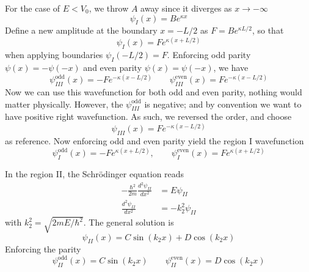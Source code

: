 \documentclass[../../../main.tex]{subfiles}
\begin{document}
For the case of $E<V_0$, we throw $A$ away since it diverges as $x \rightarrow -\infty$
\begin{equation*}
  \psi_{I}(x) = B e^{\kappa x}
\end{equation*}
Define a new amplitude at the boundary \(x = -L/2\) as $F = B e^{\kappa L/2}$, so that
\begin{equation*}
  \psi_{I}(x) = F e^{\kappa (x + L/2)}
\end{equation*}
when applying boundaries $\psi_{I}(-L/2) = F$.
Enforcing odd parity $\psi(x)=-\psi(-x)$ and even  parity $\psi(x)=\psi(-x)$, we have
\begin{equation*}
  \psi_{III}^{\text{odd}}(x) = -F e^{-\kappa (x - L/2)}
  \qquad
  \psi_{III}^{\text{even}}(x) = F e^{-\kappa (x - L/2)}
\end{equation*}
Now we can use this wavefunction for both odd and even parity, nothing would matter physically.
However, the $\psi_{III}^{\text{odd}}$ is negative; and by convention we want to have positive right wavefunction.
As such, we reversed the order, and choose
\begin{equation*}
  \psi_{III}(x) = F e^{-\kappa (x - L/2)}
\end{equation*}
as reference.
Now enforcing odd and even parity yield the region I wavefunction
\begin{equation*}
  \psi_{I}^{\text{odd}}(x) = -F e^{\kappa (x + L/2)},
  \qquad
  \psi_{I}^{\text{even}}(x) = F e^{\kappa (x + L/2)}
\end{equation*}

In the region II, the Schrödinger equation reads
\begin{align*}
  -\frac{\hbar^2}{2 m} \frac{d^2 \psi_{II}}{dx^2} & =  E \psi_{II}      \\
  \frac{d^2 \psi_{II}}{dx^2}                      & = - k_2^2 \psi_{II}
\end{align*}
with $k_2^2=\sqrt{2mE/\hbar^2}$.
The general solution is
\begin{equation*}
  \psi_{II}(x)=C\sin (k_2x)+D \cos (k_2x)
\end{equation*}
Enforcing the parity
\begin{equation*}
  \psi_{II}^{\text{odd}}(x) = C \sin (k_2x)
  \qquad
  \psi_{II}^{\text{even}}(x) =  D \cos (k_2x)
\end{equation*}
\end{document}
